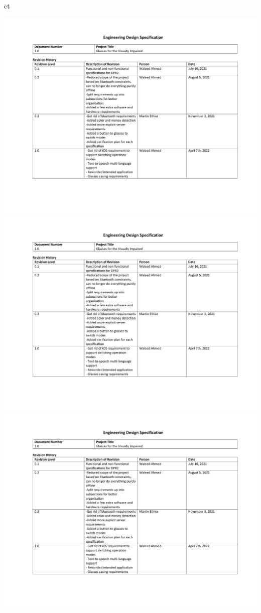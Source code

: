 ct\documentclass[a4paper,11pt]{article}
\begin{document}
\begin{landscape}
\begin{center}
        \includegraphics[page=3,width={0.86\linewidth}]{pdf/eds_1.0.pdf}
        \newpage
        \includegraphics[page=4,width={0.86\linewidth}]{pdf/eds_1.0.pdf}
        \newpage
        \includegraphics[page=5,width={0.86\linewidth}]{pdf/eds_1.0.pdf}

\end{center}
\end{landscape}
\end{document}
